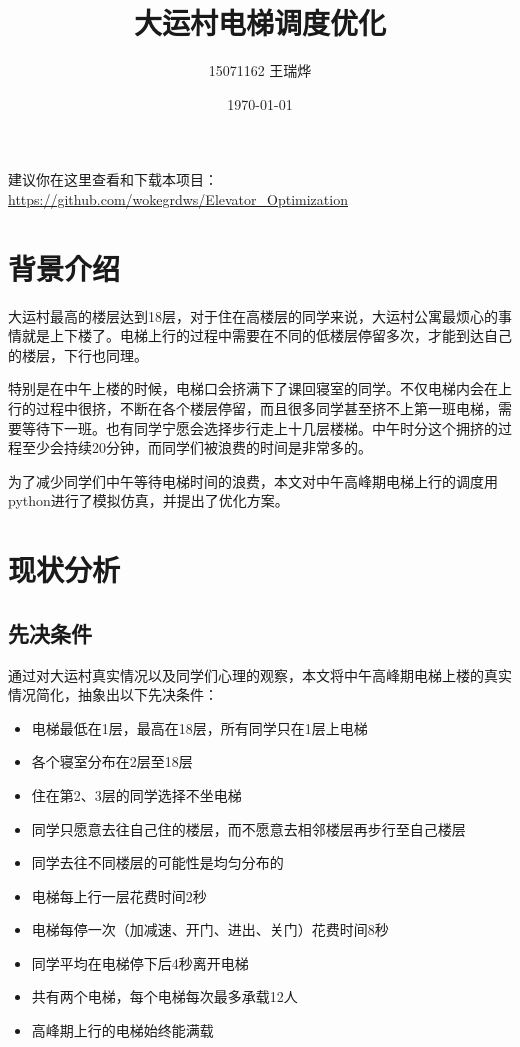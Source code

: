 \documentclass[letterpaper,12pt]{article}
\begin{document}
\title{大运村电梯调度优化}
\author{15071162 王瑞烨}
\date{\today}
\maketitle
\iffalse
\begin{abstract}
本文对大运村公寓现有的电梯调度进行了观察、记录、仿真，发现了有很大的优化空间。特别是针对中午时间大批同学需要通过电梯上楼造成极度拥挤的现象，本文给出了两种优化方案，分别用python进行了仿真，并将优化结果与现有的情况进行了比较。

\textbf{关键字：}电梯调度 \quad 优化 \quad python仿真

\end{abstract}
\fi

建议你在这里查看和下载本项目：\url{https://github.com/wokegrdws/Elevator_Optimization}

\section{背景介绍}

大运村最高的楼层达到18层，对于住在高楼层的同学来说，大运村公寓最烦心的事情就是上下楼了。电梯上行的过程中需要在不同的低楼层停留多次，才能到达自己的楼层，下行也同理。

特别是在中午上楼的时候，电梯口会挤满下了课回寝室的同学。不仅电梯内会在上行的过程中很挤，不断在各个楼层停留，而且很多同学甚至挤不上第一班电梯，需要等待下一班。也有同学宁愿会选择步行走上十几层楼梯。中午时分这个拥挤的过程至少会持续20分钟，而同学们被浪费的时间是非常多的。

为了减少同学们中午等待电梯时间的浪费，本文对中午高峰期电梯上行的调度用python进行了模拟仿真，并提出了优化方案。




\section{现状分析}
\subsection{先决条件}\label{先决条件}
通过对大运村真实情况以及同学们心理的观察，本文将中午高峰期电梯上楼的真实情况简化，抽象出以下先决条件：
\begin{itemize}
    \item 电梯最低在1层，最高在18层，所有同学只在1层上电梯
    \item 各个寝室分布在2层至18层
    \item 住在第2、3层的同学选择不坐电梯
    \item 同学只愿意去往自己住的楼层，而不愿意去相邻楼层再步行至自己楼层
    \item 同学去往不同楼层的可能性是均匀分布的
    \item 电梯每上行一层花费时间2秒
    \item 电梯每停一次（加减速、开门、进出、关门）花费时间8秒
    \item 同学平均在电梯停下后4秒离开电梯
    \item 共有两个电梯，每个电梯每次最多承载12人
    \item 高峰期上行的电梯始终能满载
\end{itemize}
\end{document}
